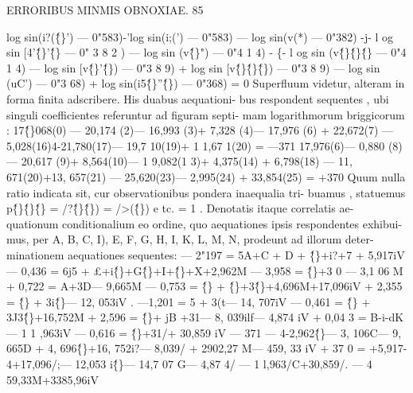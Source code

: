 \documentclass[12pt,a4paper]{article}
\begin{document}
\newpage
\begin{center}
\textsc{ERRORIBUS MINMIS OBNOXIAE. 85}
\end{center}
log sin(i?(\^\{\}') --- 0"583)-'log sin(i;(') --- 0"583) --- log sin(v(*) --- 0"382)
-j- l og sin [4'\^\{\}'\^\{\} --- 0" 3 8 2 ) --- log sin (v\^\{\}") --- 0"4 1 4) - \{- l og sin (v\^\{\}\^\{\}\^\{\} --- 0"4 1 4)
--- log sin [v\^\{\}'\^\{\}) --- 0"3 8 9) + log sin [v\^\{\}\^\{\}\^\{\}) --- 0"3 8 9) --- log sin (uC') --- 0"3 68)
+ log sin(i5\^\{\}''\^\{\}) --- 0"368) = 0
Superfluum videtur, alteram in forma finita adscribere. His duabus aequationi-
bus respondent sequentes , ubi singuli coefficientes referuntur ad figuram septi-
mam logarithmorum briggicorum :
17\^\{\}068(0) --- 20,174 (2)--- 16,993 (3)+ 7,328 (4)--- 17,976 (6) + 22,672(7)
--- 5,028(16)4-21,780(17)--- 19,7 10(19)+ 1 1,67 1(20) = ---371
17,976(6)--- 0,880 (8) --- 20,617 (9)+ 8,564(10)--- 1 9,082(1 3)+ 4,375(14)
+ 6,798(18) --- 11, 671(20)+13, 657(21) --- 25,620(23)--- 2,995(24)
+ 33,854(25) = +370
Quum nulla ratio indicata sit, cur observationibus pondera inaequalia tri-
buamus , statuemus p\^\{\}\^\{\}\^\{\} = /?\^\{\}\^\{\}) = />(\^\{\}) e tc. = 1 . Denotatis itaque correlatis ae-
quationum conditionalium eo ordine, quo aequationes ipsis respondentes exhibui-
mus, per A, B, C, I), E, F, G, H, I, K, L, M, N, prodeunt ad illorum deter-
minationem aequationes sequentes:
--- 2"197 = 5A+C + D + \^\{\}+i?+7 + 5,917iV
--- 0,436 = 6j5 + £+i\^\{\}+G\^\{\}+I+\^\{\}+X+2,962M
--- 3,958 = \^\{\}+3 0 --- 3,1 06 M
+ 0,722 = A+3D--- 9,665M
--- 0,753 = \^\{\} + \^\{\}+3\^\{\}+4,696M+17,096iV
+ 2,355 = \^\{\} + 3i\^\{\}--- 12, 053iV
. ---1,201 = 5 + 3(t--- 14, 707iV
--- 0,461 = \^\{\} + 3J3\^\{\}+16,752M
+ 2,596 = \^\{\}+ jB +31--- 8, 039ilf--- 4,874 iV
+ 0,04 3 = B-i-dK--- 1 1 ,963iV
--- 0,616 = \^\{\}+31/+ 30,859 iV
--- 371 --- 4-2,962\^\{\}--- 3, 106C--- 9, 665D + 4, 696\^\{\}+16, 752i?--- 8,039/
+ 2902,27 M--- 459, 33 iV
+ 37 0 = +5,917-4+17,096/;--- 12,053 i\^\{\}--- 14,7 07 G--- 4,87 4/
--- 1 l,963/C+30,859/. --- 4 59,33M+3385,96iV
\end{document}
